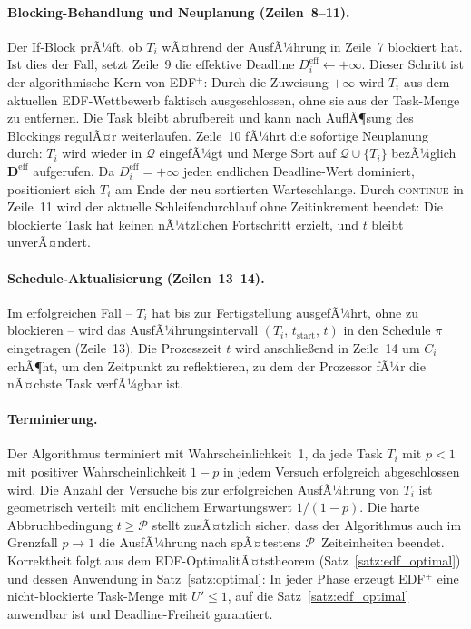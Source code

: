﻿\documentclass[a4paper,12pt]{article}
\theoremstyle{definition}
\begin{document}
	\paragraph{Blocking-Behandlung und Neuplanung (Zeilen~8--11).}
	Der If-Block prÃ¼ft, ob $T_i$ wÃ¤hrend der AusfÃ¼hrung in Zeile~7 blockiert hat.
	Ist dies der Fall, setzt Zeile~9 die effektive Deadline
	$D_i^{\text{eff}} \leftarrow +\infty$. Dieser Schritt ist der algorithmische Kern von
	EDF$^+$: Durch die Zuweisung $+\infty$ wird $T_i$ aus dem aktuellen EDF-Wettbewerb
	faktisch ausgeschlossen, ohne sie aus der Task-Menge zu entfernen. Die Task bleibt
	abrufbereit und kann nach AuflÃ¶sung des Blockings regulÃ¤r weiterlaufen.
	Zeile~10 fÃ¼hrt die sofortige Neuplanung durch: $T_i$ wird wieder in $\mathcal{Q}$
	eingefÃ¼gt und Merge Sort auf $\mathcal{Q} \cup \{T_i\}$ bezÃ¼glich
	$\mathbf{D}^{\text{eff}}$ aufgerufen. Da $D_i^{\text{eff}} = +\infty$ jeden
	endlichen Deadline-Wert dominiert, positioniert sich $T_i$ am Ende der neu sortierten
	Warteschlange. Durch \textsc{continue} in Zeile~11 wird der aktuelle Schleifendurchlauf
	ohne Zeitinkrement beendet: Die blockierte Task hat keinen nÃ¼tzlichen Fortschritt
	erzielt, und $t$ bleibt unverÃ¤ndert.
	
	\paragraph{Schedule-Aktualisierung (Zeilen~13--14).}
	Im erfolgreichen Fall -- $T_i$ hat bis zur Fertigstellung ausgefÃ¼hrt, ohne zu blockieren --
	wird das AusfÃ¼hrungsintervall $(T_i,\, t_{\text{start}},\, t)$ in den Schedule $\pi$
	eingetragen (Zeile~13). Die Prozesszeit $t$ wird anschlie\ss{}end in Zeile~14 um $C_i$
	erhÃ¶ht, um den Zeitpunkt zu reflektieren, zu dem der Prozessor fÃ¼r die nÃ¤chste
	Task verfÃ¼gbar ist.
	
	\paragraph{Terminierung.}
	Der Algorithmus terminiert mit Wahrscheinlichkeit~1, da jede Task $T_i$ mit $p < 1$
	mit positiver Wahrscheinlichkeit $1-p$ in jedem Versuch erfolgreich abgeschlossen wird.
	Die Anzahl der Versuche bis zur erfolgreichen AusfÃ¼hrung von $T_i$ ist geometrisch
	verteilt mit endlichem Erwartungswert $1/(1-p)$. Die harte Abbruchbedingung
	$t \ge \mathcal{P}$ stellt zusÃ¤tzlich sicher, dass der Algorithmus auch im
	Grenzfall $p \to 1$ die AusfÃ¼hrung nach spÃ¤testens $\mathcal{P}$~Zeiteinheiten
	beendet. Korrektheit folgt aus dem EDF-OptimalitÃ¤tstheorem
	(Satz~\ref{satz:edf_optimal}) und dessen Anwendung in
	Satz~\ref{satz:optimal}: In jeder Phase erzeugt EDF$^+$ eine
	nicht-blockierte Task-Menge mit $U' \le 1$, auf die
	Satz~\ref{satz:edf_optimal} anwendbar ist und Deadline-Freiheit garantiert.
	
\end{document}
